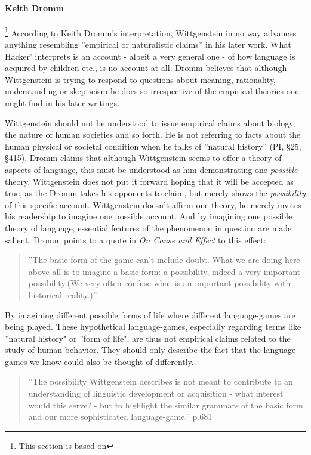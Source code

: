 \documentclass{article}
\begin{document}
\paragraph{Keith Dromm}\footnote{This section is based on }%
According to Keith Dromm's interpretation, Wittgenstein in no way advances anything resembling ''empirical or naturalistic claims'' in his later work. What Hacker' interprets is an account - albeit a very general one - of  how language is acquired by children etc., is no account at all. Dromm believes that although Wittgenstein is trying to respond to questions about meaning, rationality, understanding or skepticism he does so irrespective of the empirical theories one might find in his later writings.

Wittgenstein should not be understood to issue empirical claims about biology, the nature of human societies and so forth. He is not referring to facts about the human physical or societal condition when he talks of ''natural history'' (PI, §25, §415). Dromm claims that although Wittgenstein seems to offer a theory of aspects of language, this must be understood as him demonstrating one \textit{possible} theory. Wittgenstein does not put it forward hoping that it will be accepted as true, as the Dromm takes his opponents to claim, but merely shows the \textit{possibility} of this specific account. Wittgenstein doesn't affirm one theory, he merely invites his readership to imagine one possible account. And by imagining one possible theory of language, essential features of the phenomenon in question are made salient. Dromm points to a quote in \textit{On Cause and Effect} to this effect:
\begin{quote}
''The basic form of the game can't include doubt. What we are doing here above all is to imagine a basic form: a possibility, indeed a very important possibility.(We very often confuse what is an important possibility with historical reality.)''
\end{quote}
By imagining different possible forms of life where different language-games are being played. These hypothetical language-games, especially regarding terms like ''natural history" or ''form of life", are thus not empirical claims related to the study of human behavior. They should only describe the fact that the language-games we know could also be thought of differently.
\begin{quote}
''The possibility Wittgenstein describes is not meant to contribute to an understanding of linguistic development or acquisition - what interest would this serve? - but to highlight the similar grammars of the basic form and our more sophisticated language-game.'' p.681
\end{quote}
\end{document}
